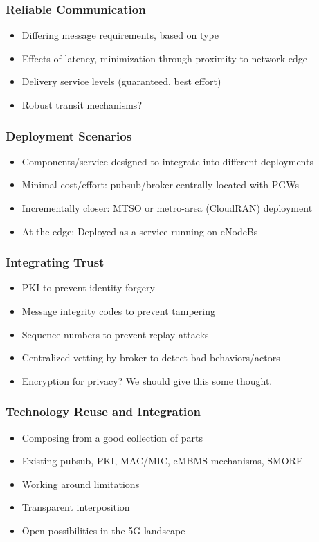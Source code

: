\subsubsection{Reliable Communication}

\begin{itemize}
\item Differing message requirements, based on type
\item Effects of latency, minimization through proximity to network edge
\item Delivery service levels (guaranteed, best effort)
\item Robust transit mechanisms?
\end{itemize}

\subsubsection{Deployment Scenarios}

\begin{itemize}
\item Components/service designed to integrate into different deployments
\item Minimal cost/effort: pubsub/broker centrally located with PGWs
\item Incrementally closer: MTSO or metro-area (CloudRAN) deployment
\item At the edge: Deployed as a service running on eNodeBs
\end{itemize}

\subsubsection{Integrating Trust}

\begin{itemize}
\item PKI to prevent identity forgery
\item Message integrity codes to prevent tampering
\item Sequence numbers to prevent replay attacks
\item Centralized vetting by broker to detect bad behaviors/actors
\item Encryption for privacy? We should give this some thought.
\end{itemize}

\subsubsection{Technology Reuse and Integration}

\begin{itemize}
\item Composing from a good collection of parts
\item Existing pubsub, PKI, MAC/MIC, eMBMS mechanisms, SMORE
\item Working around limitations
\item Transparent interposition
\item Open possibilities in the 5G landscape
\end{itemize}
